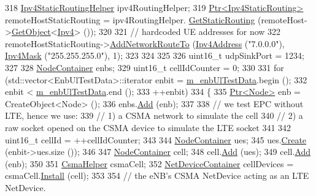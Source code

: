 \begin{DoxyCode}
318   \hyperlink{classns3_1_1Ipv4StaticRoutingHelper}{Ipv4StaticRoutingHelper} ipv4RoutingHelper;
319   \hyperlink{classns3_1_1Ptr}{Ptr<Ipv4StaticRouting>} remoteHostStaticRouting = ipv4RoutingHelper.
      \hyperlink{classns3_1_1Ipv4StaticRoutingHelper_a731206e50d305695dac7fb2ef963a4bb}{GetStaticRouting} (remoteHost->\hyperlink{classns3_1_1Object_a13e18c00017096c8381eb651d5bd0783}{GetObject}<\hyperlink{classns3_1_1Ipv4}{Ipv4}> ());
320 
321   \textcolor{comment}{// hardcoded UE addresses for now}
322   remoteHostStaticRouting->\hyperlink{classns3_1_1Ipv4StaticRouting_a8bf5eaa7ba49fe33c78c70d5560b6c39}{AddNetworkRouteTo} (\hyperlink{classns3_1_1Ipv4Address}{Ipv4Address} (\textcolor{stringliteral}{"7.0.0.0"}), 
      \hyperlink{classns3_1_1Ipv4Mask}{Ipv4Mask} (\textcolor{stringliteral}{"255.255.255.0"}), 1);
323   
324 
325 
326   uint16\_t udpSinkPort = 1234;
327     
328   \hyperlink{classns3_1_1NodeContainer}{NodeContainer} enbs;
329   uint16\_t cellIdCounter = 0;
330 
331   \textcolor{keywordflow}{for} (std::vector<EnbUlTestData>::iterator enbit = \hyperlink{classEpcS1uUlTestCase_a2d52c6d9f4ee886f2060016760d7bf4d}{m\_enbUlTestData}.begin ();
332        enbit < \hyperlink{classEpcS1uUlTestCase_a2d52c6d9f4ee886f2060016760d7bf4d}{m\_enbUlTestData}.end ();
333        ++enbit)
334     \{
335       \hyperlink{classns3_1_1Ptr}{Ptr<Node>} enb = CreateObject<Node> ();
336       enbs.\hyperlink{classns3_1_1NodeContainer_aa60b3a0e70f2fb324e16ffcf8bf31fcb}{Add} (enb);      
337 
338       \textcolor{comment}{// we test EPC without LTE, hence we use:}
339       \textcolor{comment}{// 1) a CSMA network to simulate the cell}
340       \textcolor{comment}{// 2) a raw socket opened on the CSMA device to simulate the LTE socket}
341 
342       uint16\_t cellId = ++cellIdCounter;
343 
344       \hyperlink{classns3_1_1NodeContainer}{NodeContainer} ues;
345       ues.\hyperlink{classns3_1_1NodeContainer_a787f059e2813e8b951cc6914d11dfe69}{Create} (enbit->ues.size ());
346 
347       \hyperlink{classns3_1_1NodeContainer}{NodeContainer} cell;
348       cell.\hyperlink{classns3_1_1NodeContainer_aa60b3a0e70f2fb324e16ffcf8bf31fcb}{Add} (ues);
349       cell.\hyperlink{classns3_1_1NodeContainer_aa60b3a0e70f2fb324e16ffcf8bf31fcb}{Add} (enb);
350 
351       \hyperlink{classns3_1_1CsmaHelper}{CsmaHelper} csmaCell;      
352       \hyperlink{classns3_1_1NetDeviceContainer}{NetDeviceContainer} cellDevices = csmaCell.\hyperlink{classns3_1_1CsmaHelper_af79a91372595230b0817200270ab84e7}{Install} (cell);
353 
354       \textcolor{comment}{// the eNB's CSMA NetDevice acting as an LTE NetDevice. }

\end{DoxyCode}

